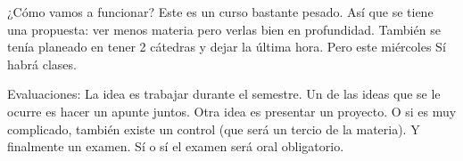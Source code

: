 ¿Cómo vamos a funcionar? Este es un curso bastante pesado. Así que se tiene una propuesta: ver menos materia pero verlas bien en profundidad. También se tenía planeado en tener 2 cátedras y dejar la última hora. Pero este miércoles Sí habrá clases.

Evaluaciones: La idea es trabajar durante el semestre. Un de las ideas que se le ocurre es hacer un apunte juntos. Otra idea es presentar un proyecto. O si es muy complicado, también existe un control (que será un tercio de la materia). Y finalmente un examen. Sí o sí el examen será oral obligatorio.
